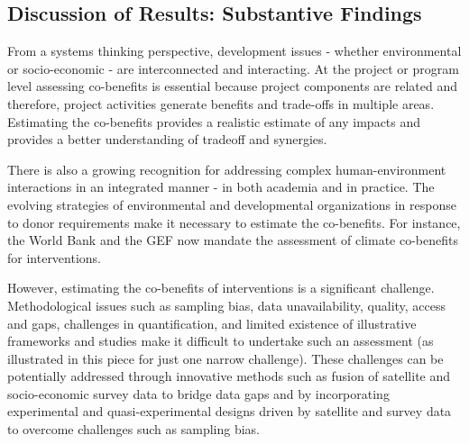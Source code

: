 \documentclass[sustainability,article,submit,moreauthors,pdftex]{Definitions/mdpi}
\begin{document}
\subsection{Discussion of Results: Substantive Findings}
From a systems thinking perspective, development issues - whether environmental or socio-economic - are interconnected and interacting. At the project or program level assessing co-benefits is essential because project components are related and therefore, project activities generate benefits and trade-offs in multiple areas. Estimating the co-benefits provides a realistic estimate of any impacts and provides a better understanding of tradeoff and synergies. 
\par
There is also a growing recognition for addressing complex human-environment interactions in an integrated manner - in both academia and in practice. The evolving strategies of environmental and developmental organizations in response to donor requirements make it necessary to estimate the co-benefits.  For instance, the World Bank and the GEF now mandate the assessment of climate co-benefits for interventions.
\par
However, estimating the co-benefits of interventions is a significant challenge. Methodological issues such as sampling bias, data unavailability, quality, access and gaps, challenges in quantification, and limited existence of illustrative frameworks and studies make it difficult to undertake such an assessment (as illustrated in this piece for just one narrow challenge). These challenges can be potentially addressed through innovative methods such as fusion of satellite and socio-economic survey data to bridge data gaps and by incorporating experimental and quasi-experimental designs driven by satellite and survey data to overcome challenges such as sampling bias.
\end{document}
